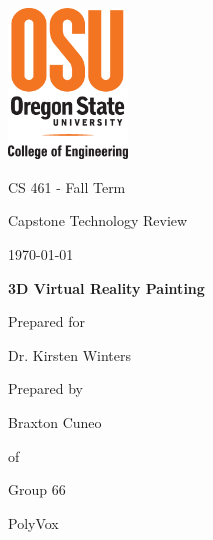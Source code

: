 \documentclass[onecolumn, draftclsnofoot,10pt, compsoc]{IEEEtran}
\def \CapstoneTeamName{			PolyVox}
\def \CapstoneTeamNumber{		66}
\def \GroupMemberThree{			Braxton Cuneo}
\def \CapstoneProjectName{		3D Virtual Reality Painting}
\def \DocType{			%
				Technology Review
				}
\begin{document}
\begin{titlepage}
    \begin{singlespace}
    	\includegraphics[height=4cm]{coe_v_spot1}
        \hfill 
        \par\vspace{.2in}
        \centering
        \scshape{
        	\huge CS 461 - Fall Term\par
            \huge Capstone \DocType \par
            {\large\today}\par
            \vspace{.5in}
            \textbf{\Huge\CapstoneProjectName}\par
            \vfill
            {\large Prepared for}\par
            \Huge Dr. Kirsten Winters\par
            \vspace{5pt}
            {\large Prepared by }\par
            \GroupMemberThree\par
            of\par
            Group\CapstoneTeamNumber\par
            \CapstoneTeamName\par 
            \vspace{20pt}
        }
        \begin{abstract}
	As the member in charge of managing the back end of the PolyVox system, it is important to make decisions that ensure optimal performance and flexibility in operation.
	To these ends, the data representing the environment of the system will be structured as voxels in an sparse voxel octree. The tools manipulating this data will be encoded in shader code which is dynamically loaded by the system and injected into a standard tool template. Once compiled as part of this template, a tool's code is then run on the GPU managing the environment data of the system whenever the user invokes the use of that tool.        

	\end{abstract}     
    \end{singlespace}
\end{titlepage}
\newpage
{}
\tableofcontents
\clearpage
\end{document}
